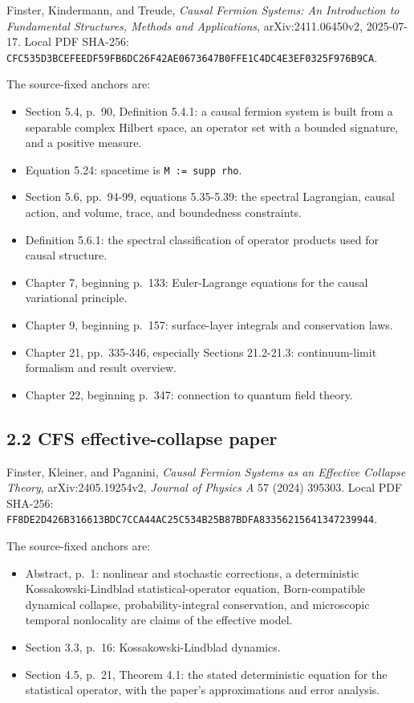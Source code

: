 \documentclass[
  american,
  11pt,
  letterpaper,
]{article}
\providecommand{\tightlist}{%
  \setlength{\itemsep}{0pt}\setlength{\parskip}{0pt}}
\begin{document}
Finster, Kindermann, and Treude, \emph{Causal Fermion Systems: An Introduction to Fundamental Structures, Methods and Applications}, arXiv:2411.06450v2, 2025-07-17. Local PDF SHA-256: \nolinkurl{CFC535D3BCEFEEDF59FB6DC26F42AE0673647B0FFE1C4DC4E3EF0325F976B9CA}.

The source-fixed anchors are:

\begin{itemize}
\tightlist
\item
  Section 5.4, p.~90, Definition 5.4.1: a causal fermion system is built from a separable complex Hilbert space, an operator set with a bounded signature, and a positive measure.
\item
  Equation 5.24: spacetime is \texttt{M\ :=\ supp\ rho}.
\item
  Section 5.6, pp.~94-99, equations 5.35-5.39: the spectral Lagrangian, causal action, and volume, trace, and boundedness constraints.
\item
  Definition 5.6.1: the spectral classification of operator products used for causal structure.
\item
  Chapter 7, beginning p.~133: Euler-Lagrange equations for the causal variational principle.
\item
  Chapter 9, beginning p.~157: surface-layer integrals and conservation laws.
\item
  Chapter 21, pp.~335-346, especially Sections 21.2-21.3: continuum-limit formalism and result overview.
\item
  Chapter 22, beginning p.~347: connection to quantum field theory.
\end{itemize}

\subsection{2.2 CFS effective-collapse paper}\label{cfs-effective-collapse-paper}

Finster, Kleiner, and Paganini, \emph{Causal Fermion Systems as an Effective Collapse Theory}, arXiv:2405.19254v2, \emph{Journal of Physics A} 57 (2024) 395303. Local PDF SHA-256: \nolinkurl{FF8DE2D426B316613BDC7CCA44AC25C534B25B87BDFA83356215641347239944}.

The source-fixed anchors are:

\begin{itemize}
\tightlist
\item
  Abstract, p.~1: nonlinear and stochastic corrections, a deterministic Kossakowski-Lindblad statistical-operator equation, Born-compatible dynamical collapse, probability-integral conservation, and microscopic temporal nonlocality are claims of the effective model.
\item
  Section 3.3, p.~16: Kossakowski-Lindblad dynamics.
\item
  Section 4.5, p.~21, Theorem 4.1: the stated deterministic equation for the statistical operator, with the paper's approximations and error analysis.
\end{itemize}
\end{document}
